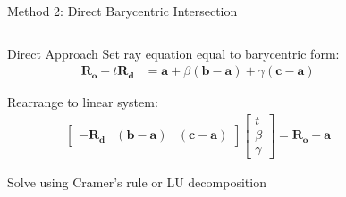 \begin{frame}{Method 2: Direct Barycentric Intersection}
    \begin{columns}
        \begin{column}{0.5\textwidth}
            \begin{mathbox}{Direct Approach}
                Set ray equation equal to barycentric form:
                \begin{align}
                    \mathbf{R_o} + t\mathbf{R_d} &= \mathbf{a} + \beta(\mathbf{b}-\mathbf{a}) + \gamma(\mathbf{c}-\mathbf{a})
                \end{align}
                
                Rearrange to linear system:
                \begin{align}
                    \begin{bmatrix}
                        -\mathbf{R_d} & (\mathbf{b}-\mathbf{a}) & (\mathbf{c}-\mathbf{a})
                    \end{bmatrix}
                    \begin{bmatrix}
                        t \\ \beta \\ \gamma
                    \end{bmatrix}
                    = \mathbf{R_o} - \mathbf{a}
                \end{align}
                
                Solve using Cramer's rule or LU decomposition
            \end{mathbox}
        \end{column}
        \begin{column}{0.5\textwidth}
\end{column}
\end{columns}
\end{frame}
